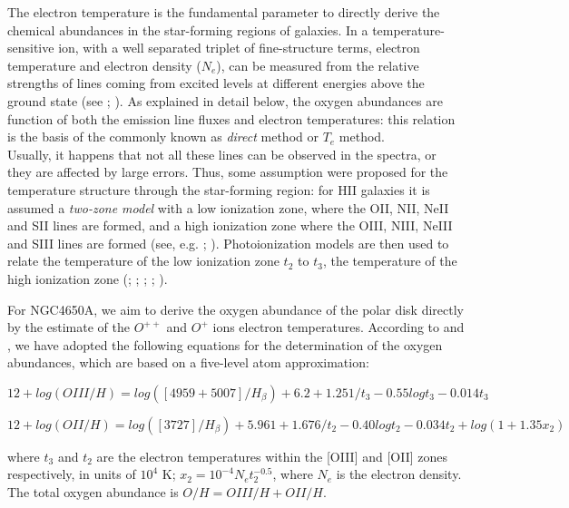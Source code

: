 \documentclass[12pt,preprint]{aastex}
\begin{document}
The electron temperature is the fundamental parameter to directly
derive the chemical abundances in the star-forming regions of
galaxies. In a temperature-sensitive ion, with a well separated
triplet of fine-structure terms, electron temperature and electron
density ($N_e$), can be measured from the relative strengths of lines
coming from excited levels at different energies above the ground
state (see \citealt{Ost89}; \citealt{All84}). As explained in detail
below, the oxygen abundances are function of both the emission line
fluxes and electron temperatures: this relation is the basis of the
commonly known as {\it direct} method or $T_e$ method.\\
Usually, it happens that not all these lines can be observed in the
spectra, or they are affected by large errors. Thus, some
assumption were proposed for the temperature structure through the
star-forming region: for HII galaxies it is assumed a {\it
two-zone model} with a low ionization zone, where the OII, NII,
NeII and SII lines are formed, and a high ionization zone where
the OIII, NIII, NeIII and SIII lines are formed (see, e.g.
\citealt{Cam86}; \citealt{Gar92}). Photoionization models are then
used to relate the temperature of the low ionization zone $t_2$ to
$t_3$, the temperature of the high ionization zone (\citealt{Pag92};
\citealt{Per03}; \citealt{Pil06}; \citealt{Pil07}; \citealt{Pil09}).

For NGC4650A, we aim to derive the oxygen abundance of the polar
disk directly by the estimate of the $O^{++}$ and $O^{+}$ ions
electron temperatures. According to \citet{Izo05} and
\citet{Pil06}, we have adopted the following equations for the
determination of the oxygen abundances, which are based on a
five-level atom approximation:

\begin{equation}\label{OHIII}
12+log(OIII/H) = log([4959+5007]/H_{\beta})+6.2+1.251/t_{3}-0.55logt_{3}-0.014t_{3}
\end{equation}

\begin{equation}\label{OHII}
12+log(OII/H)=log([3727]/H_{\beta})+5.961+1.676/t_{2}-0.40logt_{2}-0.034t_{2}+log(1+1.35x_2)
\end{equation}

where $t_{3}$ and $t_{2}$ are the electron temperatures within the
[OIII] and [OII] zones respectively, in units of $10^4$ K;
$x_{2}=10^{-4}N_{e}t_{2}^{-0.5}$, where $N_{e}$ is the electron
density. The total oxygen abundance is $O/H =OIII/H + OII/H$.
\end{document}
